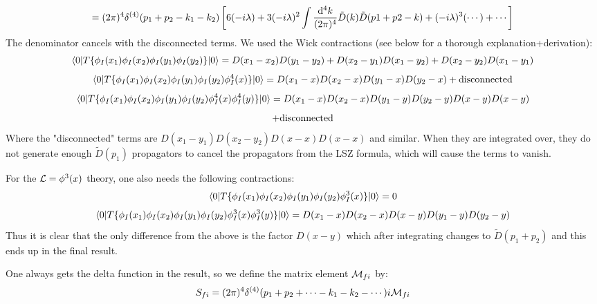 \begin{equation*}
  = (2\pi)^4\delta^{(4)}(p_1+p_2-k_1-k_2)\left[6(-i\lambda)+ 3(-i\lambda)^2\int{{\rm d}^4 k\over (2\pi)^4}\tilde D(k)\tilde D(p1+p2-k) +(-i\lambda)^3(\cdots)+\cdots\right]
\end{equation*}
The denominator cancels with the disconnected terms. We used the Wick contractions (see below for a thorough explanation+derivation): 
\begin{equation*}
  \mathinner{\langle{0|T\{\phi_I(x_1)\phi_I(x_2)\phi_I(y_1)\phi_I(y_2)\}|0}\rangle}= D(x_1-x_2)D(y_1-y_2)+D(x_2-y_1)D(x_1-y_2)+D(x_2-y_2)D(x_1-y_1)
\end{equation*}
\begin{equation*}
  \mathinner{\langle{0|T\{\phi_I(x_1)\phi_I(x_2) \phi_I(y_1)\phi_I(y_2) \phi_I^4(x)\}|0}\rangle}= D(x_1-x)D(x_2-x)D(y_1-x)D(y_2-x)+\hbox{disconnected}
\end{equation*}
\begin{equation*}
  \mathinner{\langle{0|T\{\phi_I(x_1)\phi_I(x_2) \phi_I(y_1)\phi_I(y_2) \phi_I^4(x)\phi_I^4(y)\}|0}\rangle}= D(x_1-x)D(x_2-x)D(y_1-y)D(y_2-y)D(x-y)D(x-y)
\end{equation*}
\begin{equation*}
  +\hbox{disconnected}
\end{equation*}
Where the "disconnected" terms are $D(x_1-y_1)D(x_2-y_2)D(x-x)D(x-x)$ and similar. When they are integrated over, they do not generate enough $\tilde D(p_1)$ propagators to cancel the propagators from the LSZ formula, which will cause the terms to vanish.

For the ${\mathcal L}=\phi^3(x)$ theory, one also needs the following contractions: 
\begin{equation*}
  \mathinner{\langle{0|T\{\phi_I(x_1)\phi_I(x_2) \phi_I(y_1)\phi_I(y_2) \phi_I^3(x)\}|0}\rangle} = 0
\end{equation*}
\begin{equation*}
  \mathinner{\langle{0|T\{\phi_I(x_1)\phi_I(x_2) \phi_I(y_1)\phi_I(y_2) \phi_I^3(x)\phi_I^3(y)\}|0}\rangle} = D(x_1-x)D(x_2-x)D(x-y)D(y_1-y)D(y_2-y)
\end{equation*}
Thus it is clear that the only difference from the above is the factor $D(x-y)$ which after integrating changes to $\tilde D(p_1+p_2)$ and this ends up in the final result.

One always gets the delta function in the result, so we define the matrix element ${\mathcal M}_{fi}$ by: 
\begin{equation*}
  S_{fi} = (2\pi)^4\delta^{(4)}(p_1+p_2+\cdots - k_1 - k_2 - \cdots) i {\mathcal M}_{fi}
\end{equation*}

